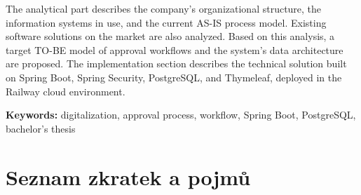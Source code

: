 \documentclass[
  a4paper,          %
  11pt,             %
  oneside,          %
  openany           %
]{report}
\begin{document}
The analytical part describes the company's organizational structure, the information systems
in use, and the current AS-IS process model. Existing software solutions on the market are
also analyzed. Based on this analysis, a target TO-BE model of approval workflows and the
system's data architecture are proposed. The implementation section describes the technical
solution built on Spring Boot, Spring Security, PostgreSQL, and Thymeleaf, deployed in
the Railway cloud environment.

\vspace{0.5cm}
\noindent\textbf{Keywords:} digitalization, approval process, workflow, Spring Boot,
PostgreSQL, bachelor's thesis

\cleardoublepage


\tableofcontents
\cleardoublepage

\listoffigures
{}
\cleardoublepage

\listoftables
{}
\cleardoublepage

\setcounter{page}{1}



\appendix

\chapter{Seznam zkratek a pojmů}
\label{app:zkratky}
\end{document}
